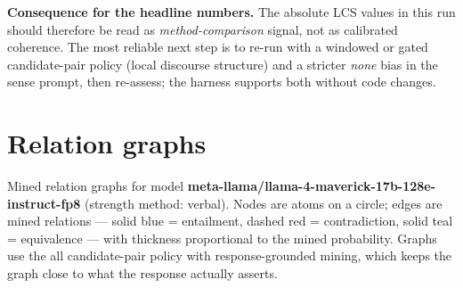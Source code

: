 \documentclass[11pt]{article}
\begin{document}
\textbf{Consequence for the headline numbers.} The absolute LCS values in this run should therefore be read as \emph{method-comparison} signal, not as calibrated coherence. The most reliable next step is to re-run with a windowed or gated candidate-pair policy (local discourse structure) and a stricter \emph{none} bias in the sense prompt, then re-assess; the harness supports both without code changes.

\section{Relation graphs}\label{sec:graphs}

Mined relation graphs for model \textbf{meta-llama/llama-4-maverick-17b-128e-instruct-fp8} (strength method: verbal). Nodes are atoms on a circle; edges are mined relations --- solid blue = entailment, dashed red = contradiction, solid teal = equivalence --- with thickness proportional to the mined probability. Graphs use the all candidate-pair policy with response-grounded mining, which keeps the graph close to what the response actually asserts.
\end{document}
